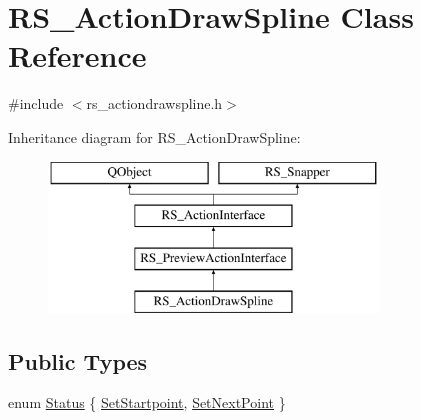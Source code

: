\hypertarget{classRS__ActionDrawSpline}{\section{R\-S\-\_\-\-Action\-Draw\-Spline Class Reference}
\label{classRS__ActionDrawSpline}
}


{\ttfamily \#include $<$rs\-\_\-actiondrawspline.\-h$>$}

Inheritance diagram for R\-S\-\_\-\-Action\-Draw\-Spline\-:\begin{figure}[H]
\begin{center}
\leavevmode
\includegraphics[height=4.000000cm]{classRS__ActionDrawSpline}
\end{center}
\end{figure}
\subsection*{Public Types}
\begin{DoxyCompactItemize}
\item 
enum \hyperlink{classRS__ActionDrawSpline_a8a6521c7221c3ad38a05f50b1662739e}{Status} \{ \hyperlink{classRS__ActionDrawSpline_a8a6521c7221c3ad38a05f50b1662739ea2744693d5ef099e38014470cb2201d1a}{Set\-Startpoint}, 
\hyperlink{classRS__ActionDrawSpline_a8a6521c7221c3ad38a05f50b1662739ea88bd07f275c3c409ecc9b9612765eb65}{Set\-Next\-Point}
 \}
\end{DoxyCompactItemize}
